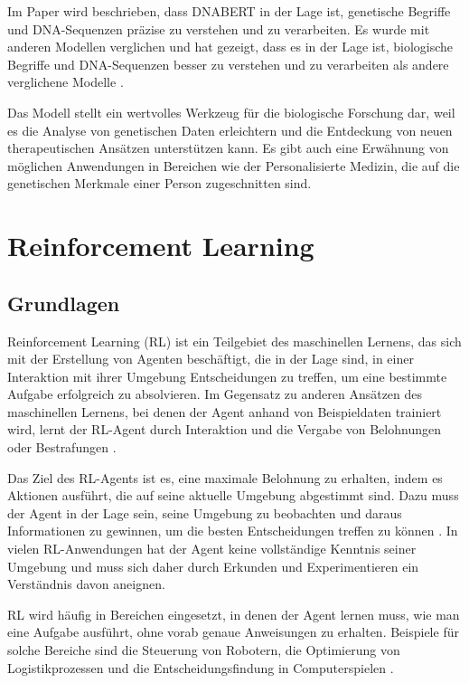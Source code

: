 \documentclass[oneside,bibliography=totocnumbered,BCOR=5mm]{scrbook}%
\theoremstyle{definition}
\theoremstyle{definition}
\theoremstyle{definition}
\theoremstyle{definition}
\theoremstyle{definition}
\theoremstyle{definition}
\begin{document}
Im Paper wird beschrieben, dass DNABERT in der Lage ist, 
genetische Begriffe und DNA-Sequenzen präzise zu verstehen und zu verarbeiten. 
Es wurde mit anderen Modellen verglichen und hat gezeigt, dass es in der Lage ist, 
biologische Begriffe und DNA-Sequenzen besser zu verstehen und zu verarbeiten als andere 
verglichene Modelle \autocite[Seite 2118]{dnabert}.


Das Modell stellt ein wertvolles Werkzeug für die biologische Forschung dar, 
weil es die Analyse von genetischen Daten erleichtern und die Entdeckung von neuen therapeutischen Ansätzen unterstützen kann. 
Es gibt auch eine Erwähnung von möglichen Anwendungen in Bereichen wie der Personalisierte Medizin, 
die auf die genetischen Merkmale einer Person zugeschnitten sind.

\clearpage

\section{Reinforcement Learning}

\subsection{Grundlagen}
Reinforcement Learning (RL) ist ein Teilgebiet des maschinellen Lernens, 
das sich mit der Erstellung von Agenten beschäftigt, die in der Lage sind, 
in einer Interaktion mit ihrer Umgebung Entscheidungen zu treffen, um eine bestimmte Aufgabe erfolgreich zu absolvieren. 
Im Gegensatz zu anderen Ansätzen des maschinellen Lernens, bei denen der Agent anhand von Beispieldaten trainiert wird, 
lernt der RL-Agent durch Interaktion und die Vergabe von Belohnungen oder Bestrafungen \autocite[Seite 2]{deepRL}.


Das Ziel des RL-Agents ist es, eine maximale Belohnung zu erhalten, indem es Aktionen ausführt, 
die auf seine aktuelle Umgebung abgestimmt sind. 
Dazu muss der Agent in der Lage sein, seine Umgebung zu beobachten und daraus Informationen zu gewinnen, 
um die besten Entscheidungen treffen zu können \autocite[Seite 2]{deepRL}. 
In vielen RL-Anwendungen hat der Agent keine vollständige Kenntnis seiner Umgebung und muss sich daher 
durch Erkunden und Experimentieren ein Verständnis davon aneignen.


RL wird häufig in Bereichen eingesetzt, in denen der Agent lernen muss, wie man eine Aufgabe ausführt, 
ohne vorab genaue Anweisungen zu erhalten. Beispiele für solche Bereiche sind die Steuerung von Robotern, 
die Optimierung von Logistikprozessen und die Entscheidungsfindung in Computerspielen \autocite[Seite 1]{deepRL}.
\end{document}
